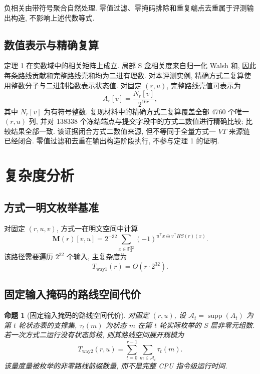 \documentclass[UTF8,a4paper,zihao=-4,fontset=fandol]{ctexart}
\numberwithin{equation}{section}
\theoremstyle{definition}
\theoremstyle{plain}
\newtheorem{proposition}[theorem]{命题}
\theoremstyle{remark}
\newcommand{\supp}{\operatorname{supp}}
\begin{document}
负相关由带符号聚合自然处理. 零值过滤、零掩码排除和重复端点去重属于评测输出构造, 不影响上述代数等式.

\subsection{数值表示与精确复算}

定理 1 在实数域中的相关矩阵上成立. 局部 S 盒相关度来自归一化 Walsh 和, 因此每条路线贡献和完整路线壳和均为二进有理数. 对本评测实例, 精确方式二复算使用整数分子与二进制指数表示状态值. 对固定 $(r,u)$, 完整路线壳值可表示为
\begin{equation}
A_r[v]=\frac{N_r[v]}{2^{16r}},
\label{eq:dyadic-exact-value}
\end{equation}
其中 $N_r[v]$ 为有符号整数. 复现材料中的精确方式二复算覆盖全部 4760 个唯一 $(r,u)$ 列, 并对 138338 个冻结端点与提交字段中的方式二数值进行精确比较; 比较结果全部一致. 该证据闭合方式二数值来源, 但不等同于全量方式一 $VT$ 来源链已经闭合. 零值过滤和去重在输出构造阶段执行, 不参与定理 1 的证明.

\section{复杂度分析}

\subsection{方式一明文枚举基准}

对固定 $(r,u,v)$, 方式一在明文空间中计算
\begin{equation}
\bm{M}(r)[v,u]=2^{-32}\sum_{x\in\mathbb F_2^{32}}(-1)^{u^\top x\oplus v^\top HS(r)(x)}.
\label{eq:way1}
\end{equation}
该路径需要遍历 $2^{32}$ 个输入, 主复杂度为
\begin{equation}
T_{\mathrm{way1}}(r)=O(r\cdot 2^{32}).
\label{eq:way1-complexity}
\end{equation}

\subsection{固定输入掩码的路线空间代价}

\begin{proposition}[固定输入掩码的路线空间代价]
对固定 $(r,u)$, 设 $\mathcal A_t=\supp(A_t)$ 为第 $t$ 轮状态表的支撑集, $\tau_t(m)$ 为状态 $m$ 在第 $t$ 轮实际枚举的 S 层非零元组数. 若一次方式二运行没有状态剪枝, 则其路线空间展开规模为
\begin{equation}
T_{\mathrm{way2}}(r,u)=\sum_{t=0}^{r-1}\sum_{m\in\mathcal A_t}\tau_t(m).
\label{eq:way2-complexity}
\end{equation}
该量度量被枚举的非零路线前缀数量, 而不是完整 CPU 指令级运行时间.
\end{proposition}
\end{document}
